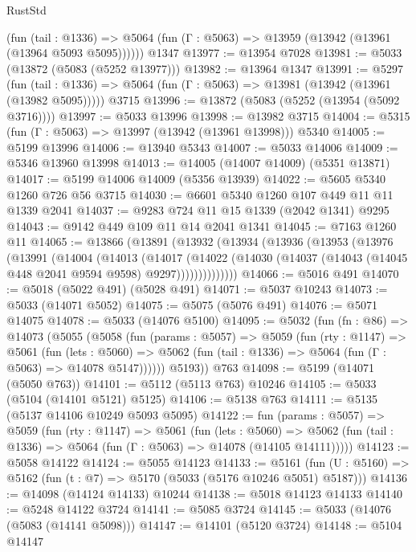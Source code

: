 \begin{lexlean}{RustStd}
\begin{coremodule}
      (fun (tail : @1336) =>
      @5064 (fun (Γ : @5063) => @13959 (@13942 (@13961 (@13964 @5093 @5095))))))
    @1347
@13977 := @13954 @7028
@13981 := @5033 (@13872 (@5083 (@5252 @13977)))
@13982 := @13964 @1347
@13991 := @5297
    (fun (tail : @1336) => @5064 (fun (Γ : @5063) => @13981 (@13942 (@13961 (@13982 @5095)))))
    @3715
@13996 := @13872 (@5083 (@5252 (@13954 (@5092 @3716))))
@13997 := @5033 @13996
@13998 := @13982 @3715
@14004 := @5315 (fun (Γ : @5063) => @13997 (@13942 (@13961 @13998))) @5340
@14005 := @5199 @13996
@14006 := @13940 @5343
@14007 := @5033 @14006
@14009 := @5346 @13960 @13998
@14013 := @14005 (@14007 @14009) (@5351 @13871)
@14017 := @5199 @14006 @14009 (@5356 @13939)
@14022 := @5605 @5340 @1260 @726 @56 @3715
@14030 := @6601 @5340 @1260 @107 @449 @11 @11 @1339 @2041
@14037 := @9283 @724 @11 @15 @1339 (@2042 @1341) @9295
@14043 := @9142 @449 @109 @11 @14 @2041 @1341
@14045 := @7163 @1260 @11
@14065 := @13866
    (@13891
      (@13932
        (@13934
          (@13936
            (@13953
              (@13976
                (@13991
                  (@14004
                    (@14013
                      (@14017
                        (@14022
                          (@14030
                            (@14037 (@14043 (@14045 @448 @2041 @9594 @9598) @9297))))))))))))))
@14066 := @5016 @491
@14070 := @5018 (@5022 @491) (@5028 @491)
@14071 := @5037 @10243
@14073 := @5033 (@14071 @5052)
@14075 := @5075 (@5076 @491)
@14076 := @5071 @14075
@14078 := @5033 (@14076 @5100)
@14095 := @5032
    (fun (fn : @86) =>
    @14073
      (@5055
        (@5058
          (fun (params : @5057) =>
          @5059
            (fun (rty : @1147) =>
            @5061
              (fun (lets : @5060) =>
              @5062 (fun (tail : @1336) => @5064 (fun (Γ : @5063) => @14078 @5147))))))
        @5193))
    @763
@14098 := @5199 (@14071 (@5050 @763))
@14101 := @5112 (@5113 @763) @10246
@14105 := @5033 (@5104 (@14101 @5121) @5125)
@14106 := @5138 @763
@14111 := @5135 (@5137 @14106 @10249 @5093 @5095)
@14122 := fun (params : @5057) =>
  @5059
    (fun (rty : @1147) =>
    @5061
      (fun (lets : @5060) =>
      @5062 (fun (tail : @1336) => @5064 (fun (Γ : @5063) => @14078 (@14105 @14111)))))
@14123 := @5058 @14122
@14124 := @5055 @14123
@14133 := @5161
    (fun (U : @5160) => @5162 (fun (t : @7) => @5170 (@5033 (@5176 @10246 @5051) @5187)))
@14136 := @14098 (@14124 @14133) @10244
@14138 := @5018 @14123 @14133
@14140 := @5248 @14122 @3724
@14141 := @5085 @3724
@14145 := @5033 (@14076 (@5083 (@14141 @5098)))
@14147 := @14101 (@5120 @3724)
@14148 := @5104 @14147

\end{coremodule}
\end{lexlean}
